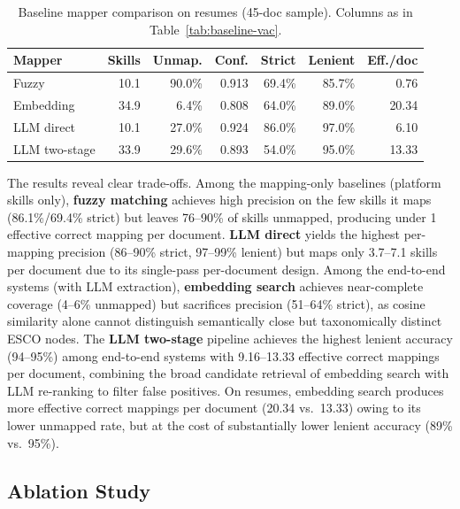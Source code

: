 \documentclass[11pt]{article}
\begin{document}
\begin{table}[h]
  \centering
  \small
  \begin{tabular}{@{}lrrrrrr@{}}
    \toprule
    \textbf{Mapper} & \textbf{Skills} & \textbf{Unmap.} & \textbf{Conf.} & \textbf{Strict} & \textbf{Lenient} & \textbf{Eff./doc} \\
    \midrule
    Fuzzy & 10.1 & 90.0\% & 0.913 & 69.4\% & 85.7\% & 0.76 \\
    Embedding & 34.9 & 6.4\% & 0.808 & 64.0\% & 89.0\% & 20.34 \\
    LLM direct & 10.1 & 27.0\% & 0.924 & 86.0\% & 97.0\% & 6.10 \\
    LLM two-stage & 33.9 & 29.6\% & 0.893 & 54.0\% & 95.0\% & 13.33 \\
    \bottomrule
  \end{tabular}
  \caption{Baseline mapper comparison on resumes (45-doc sample). Columns as in Table~\ref{tab:baseline-vac}.}
  \label{tab:baseline-res}
\end{table}

The results reveal clear trade-offs. Among the mapping-only baselines (platform skills only), \textbf{fuzzy matching} achieves high precision on the few skills it maps (86.1\%/69.4\% strict) but leaves 76--90\% of skills unmapped, producing under 1 effective correct mapping per document. \textbf{LLM direct} yields the highest per-mapping precision (86--90\% strict, 97--99\% lenient) but maps only 3.7--7.1 skills per document due to its single-pass per-document design. Among the end-to-end systems (with LLM extraction), \textbf{embedding search} achieves near-complete coverage (4--6\% unmapped) but sacrifices precision (51--64\% strict), as cosine similarity alone cannot distinguish semantically close but taxonomically distinct ESCO nodes. The \textbf{LLM two-stage} pipeline achieves the highest lenient accuracy (94--95\%) among end-to-end systems with 9.16--13.33 effective correct mappings per document, combining the broad candidate retrieval of embedding search with LLM re-ranking to filter false positives. On resumes, embedding search produces more effective correct mappings per document (20.34 vs.\ 13.33) owing to its lower unmapped rate, but at the cost of substantially lower lenient accuracy (89\% vs.\ 95\%).

\subsection{Ablation Study}
\label{sec:eval-ablation}
\end{document}
